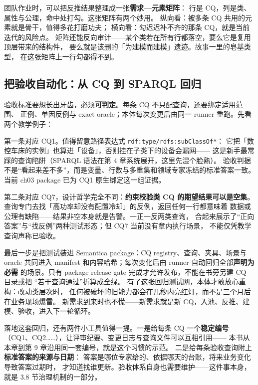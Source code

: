 团队作业时，可以把反推结果整理成一张\textbf{需求—元素矩阵}：
行是 CQ，列是类、属性与公理，命中处打勾。这张矩阵有两个妙用。
纵向看：被多条 CQ 共用的元素就是骨干，值得多花打磨功夫；
横向看：勾迟迟补不齐的那条 CQ，就是当前迭代的风险点。
矩阵还能反向审计——某个类若在所有行都落空，要么它是复用顶层带来的结构件，
要么就是该删的「为建模而建模」遗迹。故事一里的皂基类型，
在这张矩阵上一行勾都得不到。

\subsection{把验收自动化：从 CQ 到 SPARQL 回归}

验收标准要想长出牙齿，必须\textbf{可判定}。每条 CQ 不只配查询，还要绑定适用范围、
正例、单因反例与 exact oracle；本体每次变更后由同一 runner 重跑。先看两个教学例子：



第一条对应 CQ1。值得留意路径表达式 \texttt{rdf:type/rdfs:subClassOf*}：
它把「数控车床的实例」也算进「设备」，否则挂在子类下的设备会漏网——
这是新手最常踩的查询陷阱（SPARQL 语法在第 4 章系统展开，这里先混个脸熟）。
验收判据不是“看起来差不多”，而是变量、行数与多重集和领域专家冻结的标准答案一致。
当前 ch03 package 已为 CQ1 原生绑定这一组证据。

第二条对应 CQ7，设计哲学完全不同：\textbf{约束校验类 CQ 的期望结果可以是空集}。
查询专门去找「高功率却没有配置冷却」的反例，返回任何一行都意味着
数据或公理有缺陷——结果非空本身就是告警。一正一反两类查询，
合起来展示了“正向答案”与“找反例”两种测试形态；但 CQ7 当前没有章内执行场景，
不能仅凭教学查询声称已验收。

最后一步是把测试装进 Semantica package：CQ registry、查询、夹具、场景与 oracle
共同进入 manifest 和内容哈希；每次变化后由 runner 自动回归全部\textbf{声明为必需}
的场景。只有 package release gate 完成才允许发布，不能在书旁另建 CQ 目录或把
“若干查询通过”折算成全绿。
有了这张回归测试网，本体才敢放心重构：改动类层次时，
任何被破坏的旧能力都会在几秒内亮红灯，而不是三个月后在业务现场爆雷。
新需求到来时也不慌——新需求就是新 CQ，入池、反推、建模、验收，进入下一轮循环。

落地这套回归，还有两件小工具值得一提。一是给每条 CQ 一个\textbf{稳定编号}
（CQ1、CQ2……），让评审纪要、变更日志与查询文件可以互相引用——
本书从本章到第 9 章沿用同一套编号，就是这个习惯的示范。
二是给每条验收查询附上\textbf{标准答案的来源与日期}：
答案是哪位专家给的、依据哪天的台账，将来业务变化导致答案过期时，
才知道找谁更新。验收体系自身也需要维护——这件事本身，
就是 3.8 节治理机制的一部分。


